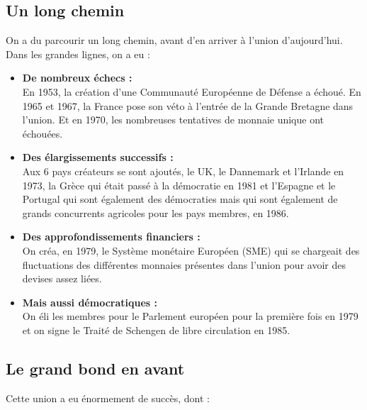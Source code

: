 \subsection{Un long chemin}
On a du parcourir un long chemin, avant d'en arriver à l'union d'aujourd'hui. Dans les grandes lignes, on a eu :

\begin{itemize}
	\item \textbf{De nombreux échecs :} \\
	      En 1953, la création d'une Communauté Européenne de Défense a échoué. En 1965 et 1967, la France pose son véto à l'entrée de la Grande Bretagne dans l'union. Et en 1970, les nombreuses tentatives de monnaie unique ont échouées.
	      	
	\item \textbf{Des élargissements successifs :} \\
	      Aux 6 pays créateurs se sont ajoutés, le UK, le Dannemark et l'Irlande en 1973, la Grèce qui était passé à la démocratie en 1981 et l'Espagne et le Portugal qui sont également des démocraties mais qui sont également de grands concurrents agricoles pour les pays membres, en 1986.
	      	
	\item \textbf{Des approfondissements financiers :} \\
	      On créa, en 1979, le Système monétaire Européen (SME) qui se chargeait des fluctuations des différentes monnaies présentes dans l'union pour avoir des devises assez liées. 
	      	
	\item \textbf{Mais aussi démocratiques :} \\
	      On éli les membres pour le Parlement européen pour la première fois en 1979 et on signe le Traité de Schengen de libre circulation en 1985.
\end{itemize}

\subsection{Le grand bond en avant}
Cette union a eu énormement de succès, dont :

